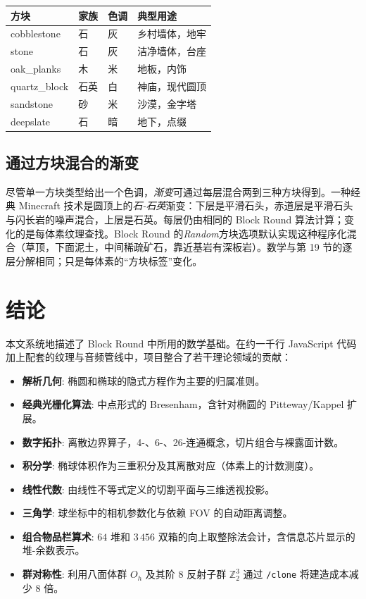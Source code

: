 \documentclass[12pt,a4paper]{scrartcl}
\newcommand{\acc}[1]{\textcolor{accent}{\textbf{#1}}}
\newcommand{\cmd}[1]{\textcolor{earth}{\texttt{\small #1}}}
\begin{document}
\vspace{0.4em}
\begin{center}
\begin{tabular}{@{}llll@{}}
\toprule
\textbf{方块} & \textbf{家族} & \textbf{色调} & \textbf{典型用途} \\
\midrule
cobblestone        & 石  & 灰  & 乡村墙体，地牢 \\
stone              & 石  & 灰  & 洁净墙体，台座 \\
oak\_planks        & 木   & 米   & 地板，内饰 \\
quartz\_block      & 石英    & 白   & 神庙，现代圆顶 \\
sandstone          & 砂   & 米   & 沙漠，金字塔 \\
deepslate          & 石  & 暗  & 地下，点缀 \\
\bottomrule
\end{tabular}
\end{center}

\subsection{通过方块混合的渐变}
尽管单一方块类型给出一个色调，\emph{渐变}可通过每层混合两到三种方块得到。一种经典 Minecraft 技术是圆顶上的\emph{石-石英}渐变：下层是平滑石头，赤道层是平滑石头与闪长岩的噪声混合，上层是石英。每层仍由相同的 Block Round 算法计算；变化的是每体素纹理查找。Block Round 的\emph{Random}方块选项默认实现这种程序化混合（草顶，下面泥土，中间稀疏矿石，靠近基岩有深板岩）。数学与第 19 节的逐层分解相同；只是每体素的\enquote{方块标签}变化。

\section{结论}

本文系统地描述了 Block Round 中所用的数学基础。在约一千行 JavaScript 代码加上配套的纹理与音频管线中，项目整合了若干理论领域的贡献：

\begin{itemize}[leftmargin=1.3em,itemsep=0.25em,topsep=0.4em]
  \item \acc{解析几何}: 椭圆和椭球的隐式方程作为主要的归属准则。
  \item \acc{经典光栅化算法}: 中点形式的 Bresenham，含针对椭圆的 Pitteway/Kappel 扩展。
  \item \acc{数字拓扑}: 离散边界算子，4-、6-、26-连通概念，切片组合与裸露面计数。
  \item \acc{积分学}: 椭球体积作为三重积分及其离散对应（体素上的计数测度）。
  \item \acc{线性代数}: 由线性不等式定义的切割平面与三维透视投影。
  \item \acc{三角学}: 球坐标中的相机参数化与依赖 FOV 的自动距离调整。
  \item \acc{组合物品栏算术}: $64$ 堆和 $3\,456$ 双箱的向上取整除法会计，含信息芯片显示的堆-余数表示。
  \item \acc{群对称性}: 利用八面体群 $O_h$ 及其阶 $8$ 反射子群 $\mathbb{Z}_2^3$ 通过 \cmd{/clone} 将建造成本减少 $8$ 倍。
\end{itemize}
\end{document}
